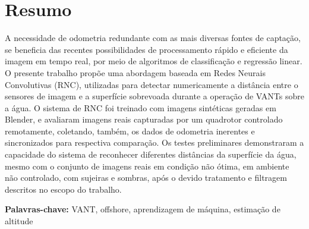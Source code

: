 \chapter*{Resumo}

A necessidade de odometria redundante com as mais diversas fontes de captação, se beneficia das recentes possibilidades de processamento rápido e eficiente da imagem em tempo real, por meio de algoritmos de classificação e regressão linear. O presente trabalho propõe uma abordagem baseada em Redes Neurais Convolutivas (RNC), utilizadas para detectar numericamente a distância entre o sensores de imagem e a superfície sobrevoada durante a operação de VANTs sobre a água. O sistema de RNC foi treinado com imagens sintéticas geradas em Blender, e avaliaram imagens reais capturadas por um quadrotor controlado remotamente, coletando, também, os dados de odometria inerentes e sincronizados para respectiva comparação. Os testes preliminares demonstraram a capacidade do sistema de reconhecer diferentes distâncias da superfície da água, mesmo com o conjunto de imagens reais em condição não ótima, em ambiente não controlado, com sujeiras e sombras, após o devido tratamento e filtragem descritos no escopo do trabalho.

\vspace{.5cm}

\textbf{Palavras-chave:} VANT, offshore, aprendizagem de máquina, estimação de altitude
